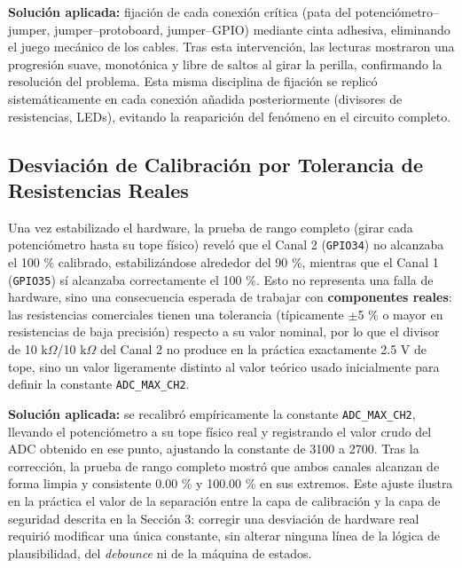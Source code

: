 \documentclass[12pt, letterpaper]{article}
\begin{document}
	\textbf{Solución aplicada:} fijación de cada conexión crítica (pata del potenciómetro–jumper, jumper–protoboard, jumper–GPIO) mediante cinta adhesiva, eliminando el juego mecánico de los cables. Tras esta intervención, las lecturas mostraron una progresión suave, monotónica y libre de saltos al girar la perilla, confirmando la resolución del problema. Esta misma disciplina de fijación se replicó sistemáticamente en cada conexión añadida posteriormente (divisores de resistencias, LEDs), evitando la reaparición del fenómeno en el circuito completo.
	
	\subsection{Desviación de Calibración por Tolerancia de Resistencias Reales}
	Una vez estabilizado el hardware, la prueba de rango completo (girar cada potenciómetro hasta su tope físico) reveló que el Canal 2 (\texttt{GPIO34}) no alcanzaba el 100 \% calibrado, estabilizándose alrededor del 90 \%, mientras que el Canal 1 (\texttt{GPIO35}) sí alcanzaba correctamente el 100 \%. Esto no representa una falla de hardware, sino una consecuencia esperada de trabajar con \textbf{componentes reales}: las resistencias comerciales tienen una tolerancia (típicamente $\pm$5 \% o mayor en resistencias de baja precisión) respecto a su valor nominal, por lo que el divisor de 10 k$\Omega$/10 k$\Omega$ del Canal 2 no produce en la práctica exactamente 2.5 V de tope, sino un valor ligeramente distinto al valor teórico usado inicialmente para definir la constante \texttt{ADC\_MAX\_CH2}.
	
	\textbf{Solución aplicada:} se recalibró empíricamente la constante \texttt{ADC\_MAX\_CH2}, llevando el potenciómetro a su tope físico real y registrando el valor crudo del ADC obtenido en ese punto, ajustando la constante de 3100 a 2700. Tras la corrección, la prueba de rango completo mostró que ambos canales alcanzan de forma limpia y consistente 0.00 \% y 100.00 \% en sus extremos. Este ajuste ilustra en la práctica el valor de la separación entre la capa de calibración y la capa de seguridad descrita en la Sección 3: corregir una desviación de hardware real requirió modificar una única constante, sin alterar ninguna línea de la lógica de plausibilidad, del \textit{debounce} ni de la máquina de estados.
	
\end{document}
